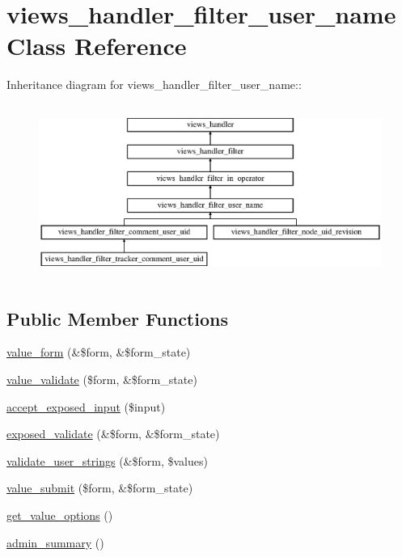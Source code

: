 \hypertarget{classviews__handler__filter__user__name}{
\section{views\_\-handler\_\-filter\_\-user\_\-name Class Reference}
\label{classviews__handler__filter__user__name}
}
Inheritance diagram for views\_\-handler\_\-filter\_\-user\_\-name::\begin{figure}[H]
\begin{center}
\leavevmode
\includegraphics[height=5.73379cm]{classviews__handler__filter__user__name}
\end{center}
\end{figure}
\subsection*{Public Member Functions}
\begin{DoxyCompactItemize}
\item 
\hyperlink{classviews__handler__filter__user__name_a08bc953c1682728eb0d38e5592a3286e}{value\_\-form} (\&\$form, \&\$form\_\-state)
\item 
\hyperlink{classviews__handler__filter__user__name_a5da3e22c33761d6902fc99cabba66a41}{value\_\-validate} (\$form, \&\$form\_\-state)
\item 
\hyperlink{classviews__handler__filter__user__name_aa6ae18031b13da1c92d83b8c5de74c15}{accept\_\-exposed\_\-input} (\$input)
\item 
\hyperlink{classviews__handler__filter__user__name_a3510a0e9b2c5fea7460a42049e0a58c0}{exposed\_\-validate} (\&\$form, \&\$form\_\-state)
\item 
\hyperlink{classviews__handler__filter__user__name_a8c3d5b4e3a63b0e39fcf36a2ab5ef43d}{validate\_\-user\_\-strings} (\&\$form, \$values)
\item 
\hyperlink{classviews__handler__filter__user__name_a35fcdce7daf9bf61ea69bee242d48cf2}{value\_\-submit} (\$form, \&\$form\_\-state)
\item 
\hyperlink{classviews__handler__filter__user__name_a039044fb84e609938564ae6c8a40580c}{get\_\-value\_\-options} ()
\item 
\hyperlink{classviews__handler__filter__user__name_aba7659d0d6c937d9c346e8ed3af532b6}{admin\_\-summary} ()
\end{DoxyCompactItemize}
